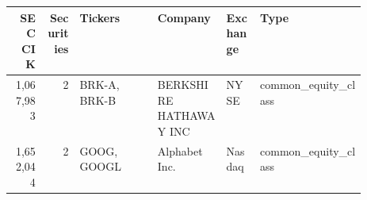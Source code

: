 \begin{tabular}{@{}rrp{0.22\linewidth}llp{0.3\linewidth}@{}}
\toprule
SEC CIK & Securities & Tickers & Company & Exchange & Type \\
\midrule
1,067,983 & 2 & BRK-A, BRK-B & BERKSHIRE HATHAWAY INC & NYSE & common\_\allowbreak{}equity\_\allowbreak{}class \\
1,652,044 & 2 & GOOG, GOOGL & Alphabet Inc. & Nasdaq & common\_\allowbreak{}equity\_\allowbreak{}class \\
\bottomrule
\end{tabular}
